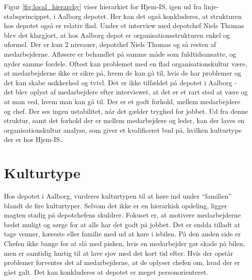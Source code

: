 Figur \ref{fig:local_hierarchy} viser hierarkiet for Hjem-IS, igen ud fra linje-stabsprincippet\cite{Organisation}, i Aalborg depotet. Her kan det også konkluderes, at strukturen hos depotet også er relativ flad. Under et interview med depotchef Niels Thomas blev det klargjort, at hos Aalborg depot er organisationsstrukturen enkel og uformel. Der er kun 2 niveauer, depotchef Niels Thomas og så resten af medarbejderne. Afløsere er behandlet på samme måde som fuldtidsansatte, og nyder samme fordele. Oftest kan problemet med en flad organisationskultur være, at medarbejderne ikke er sikre på, hvem de kan gå til, hvis de har problemer og det kan skabe usikkerhed og tvivl. Det er ikke tilfældet på depotet i Aalborg - det blev oplyst af medarbejdere efter interviewet, at det er et rart sted at være og at man ved, hvem man kan gå til. Der er et godt forhold, mellem medarbejdere og chef. Der ses ingen ustabilitet, når det gælder tryghed for jobbet. Ud fra denne struktur, samt det forhold der er mellem medarbejdere og leder, kan der laves en organisationskultur analyse, som giver et kvalificeret bud på, hvilken kulturtype der er hos Hjem-IS.

\section{Kulturtype}
Hos depotet i Aalborg, vurderes kulturtypen til at høre ind under “familien” blandt de fire kulturtyper\cite{Organisation}. Selvom det ikke er en hierarkisk opdeling, ligger magten stadig på depotchefens skuldrer. Fokuset er, at motivere medarbejderne bedst muligt og sørge for at alle har det godt på jobbet. Det er endda tilladt at tage venner, kæreste eller familie med ud at køre i isbilen. På den anden side er Chefen ikke bange for at slå med pisken, hvis en medarbejder gør skade på bilen, men er samtidig hurtig til at lave sjov med det kort tid efter. Hvis der opstår problemer forventes det af medarbejderne, at de oplyser chefen om, hvad der er gået galt. 
Det kan konkluderes at depotet er meget personorienteret.

